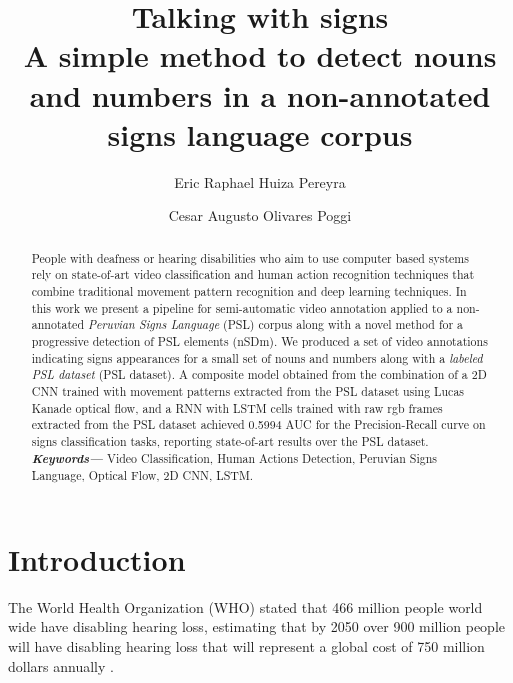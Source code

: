 \documentclass[twocolumn,conference]{article}
\providecommand{\keywords}[1]
{
  \small	
  \textbf{\textit{Keywords---}} #1
}
\begin{document}
\author[1]{Eric Raphael Huiza Pereyra}

\author[2]{Cesar Augusto Olivares Poggi}

\title{%
	\vspace{-2.0cm}
	\textbf{Talking with signs} \\	
	\Large \textbf{A simple method to detect nouns and numbers in a non-annotated signs language corpus}
}

\maketitle
    
\begin{abstract}
People with deafness or hearing disabilities who aim to use computer based systems rely on state-of-art video classification and human action recognition techniques that combine traditional movement pattern recognition and deep learning techniques. In this work we present a pipeline for semi-automatic video annotation applied to a non-annotated \textit{Peruvian Signs Language} (PSL) corpus along with a novel method for a progressive detection of PSL elements (nSDm). We produced a set of video annotations indicating signs appearances for a small set of nouns and numbers along with a \textit{labeled PSL dataset} (PSL dataset). A composite model obtained from the combination of a 2D CNN trained with movement patterns extracted from the PSL dataset using Lucas Kanade optical flow, and a RNN with LSTM cells trained with raw rgb frames extracted from the PSL dataset achieved 0.5994 AUC for the Precision-Recall curve on signs classification tasks, reporting state-of-art results over the PSL dataset. \\
\keywords{Video Classification, Human Actions Detection, Peruvian Signs Language, Optical Flow, 2D CNN, LSTM.}
\end{abstract}

\section{Introduction}\label{intro}
The World Health Organization (WHO) stated that 466 million people world wide have disabling hearing loss, estimating that by 2050 over 900 million people will have disabling hearing loss that will represent a global cost of 750 million dollars annually \cite{deafness_and_hearing_loss_2019}. 
\end{document}
